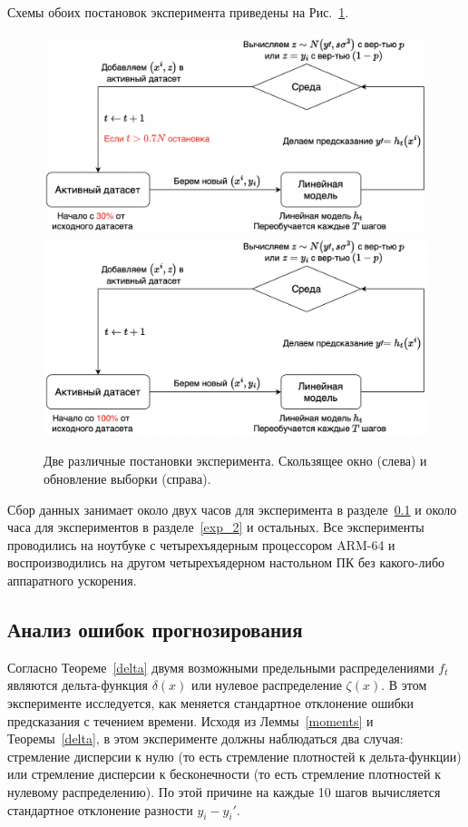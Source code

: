     Схемы обоих постановок эксперимента приведены на Рис.~\ref{ex_set}. 

    \begin{figure}[h!]
        \centering
        \includegraphics[width=0.49\linewidth]{pictures/Sliding window.png}
        \includegraphics[width=0.49\linewidth]{pictures/Sampling update.png}
        
        \caption{Две различные постановки эксперимента. Скользящее окно (слева) и обновление выборки (справа).}
        \label{ex_set}
    \end{figure}

    Сбор данных занимает около двух часов для эксперимента в разделе~\ref{exp_1} и около часа для экспериментов в разделе~\ref{exp_2} и остальных. Все эксперименты проводились на ноутбуке с четырехъядерным процессором ARM-64 и воспроизводились на другом четырехъядерном настольном ПК без какого-либо аппаратного ускорения.

\subsection{Анализ ошибок прогнозирования} \label{exp_1}

    Согласно Теореме~\ref{delta} двумя возможными предельными распределениями $f_t$ являются дельта-функция $\delta(x)$ или нулевое распределение $\zeta(x)$. В этом эксперименте исследуется, как меняется стандартное отклонение ошибки предсказания с течением времени. Исходя из Леммы~\ref{moments} и Теоремы~\ref{delta}, в этом эксперименте должны наблюдаться два случая: стремление дисперсии к нулю (то есть стремление плотностей к дельта-функции) или стремление дисперсии к бесконечности (то есть стремление плотностей к нулевому распределению). По этой причине на каждые 10 шагов вычисляется стандартное отклонение разности $y_i - y_i'$. 

